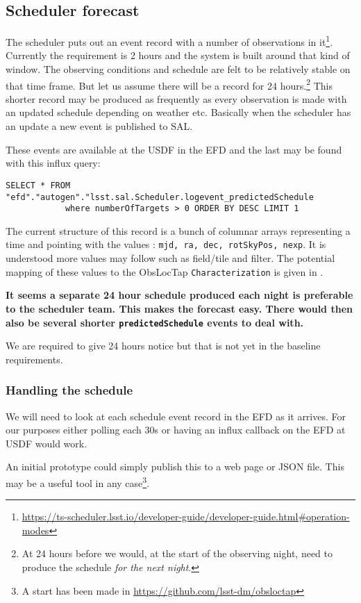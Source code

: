 \subsection{Scheduler forecast} \label{sec:forecast}
The scheduler puts out an event record with a number of observations in it\footnote{\url{https://ts-scheduler.lsst.io/developer-guide/developer-guide.html\#operation-modes}}.
Currently the requirement is 2 hours and the system is built around that kind of window.
The observing conditions and schedule are felt to be relatively stable on that time frame.
But let us assume there will be  a record for 24 hours.\footnote{
At 24 hours before we would, at the start of the observing night, need to produce the schedule  \emph{for the next night}.
}
This shorter record may be produced as frequently as every observation is made with an updated schedule depending on weather etc.
Basically when the scheduler has an update a new event is published to SAL.

These events are available at the USDF in the EFD and the last may be found with this influx query:
\begin{lstlisting}
SELECT * FROM "efd"."autogen"."lsst.sal.Scheduler.logevent_predictedSchedule
            where numberOfTargets > 0 ORDER BY DESC LIMIT 1
\end{lstlisting}

The current structure of this record is a bunch of columnar arrays representing a time and pointing with the
values : \texttt{mjd, ra, dec, rotSkyPos, nexp}.
It is understood more values may follow such as field/tile and filter.
The potential mapping of these values to the ObsLocTap \texttt{Characterization} is given in .


{\bf It seems a separate 24 hour schedule produced each night is preferable to the scheduler team. This makes the forecast easy. There would then also be several shorter \texttt{predictedSchedule} events to deal with. }

We are required to give 24 hours notice but that is not yet in the  baseline requirements.
\subsubsection{Handling the schedule}
We will need to look at each schedule event record in the EFD as it arrives.
For our purposes either polling each 30s or having an influx callback on the EFD at USDF would
work.

An initial prototype could simply publish this to a web page or JSON file.
This may be a useful tool in any case\footnote{A start has been made in \url{https://github.com/lsst-dm/obsloctap}}.



